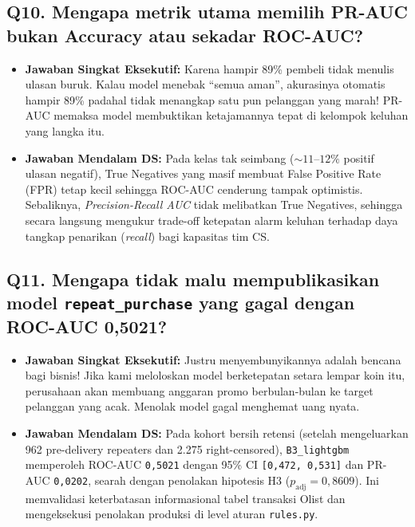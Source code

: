 \documentclass[11pt,a4paper,oneside]{book}
\newcommand{\code}[1]{{\small\nolinkurl{#1}}}
\begin{document}
\subsection*{Q10. Mengapa metrik utama memilih PR-AUC bukan Accuracy atau sekadar ROC-AUC?}
\begin{itemize}
  \item \textbf{Jawaban Singkat Eksekutif:} Karena hampir 89\% pembeli tidak menulis ulasan buruk. Kalau model menebak ``semua aman'', akurasinya otomatis hampir 89\% padahal tidak menangkap satu pun pelanggan yang marah! PR-AUC memaksa model membuktikan ketajamannya tepat di kelompok keluhan yang langka itu.
  \item \textbf{Jawaban Mendalam DS:} Pada kelas tak seimbang ($\sim 11\text{--}12\%$ positif ulasan negatif), True Negatives yang masif membuat False Positive Rate (FPR) tetap kecil sehingga ROC-AUC cenderung tampak optimistis. Sebaliknya, \emph{Precision-Recall AUC} tidak melibatkan True Negatives, sehingga secara langsung mengukur trade-off ketepatan alarm keluhan terhadap daya tangkap penarikan (\emph{recall}) bagi kapasitas tim CS.
\end{itemize}

\subsection*{Q11. Mengapa tidak malu mempublikasikan model \texttt{repeat\_purchase} yang gagal dengan ROC-AUC 0,5021?}
\begin{itemize}
  \item \textbf{Jawaban Singkat Eksekutif:} Justru menyembunyikannya adalah bencana bagi bisnis! Jika kami meloloskan model berketepatan setara lempar koin itu, perusahaan akan membuang anggaran promo berbulan-bulan ke target pelanggan yang acak. Menolak model gagal menghemat uang nyata.
  \item \textbf{Jawaban Mendalam DS:} Pada kohort bersih retensi (setelah mengeluarkan 962 pre-delivery repeaters dan 2.275 right-censored), \code{B3_lightgbm} memperoleh ROC-AUC \code{0,5021} dengan 95\% CI \code{[0,472, 0,531]} dan PR-AUC \code{0,0202}, searah dengan penolakan hipotesis H3 ($p_{\text{adj}} = 0{,}8609$). Ini memvalidasi keterbatasan informasional tabel transaksi Olist dan mengeksekusi penolakan produksi di level aturan \code{rules.py}.
\end{itemize}
\end{document}
